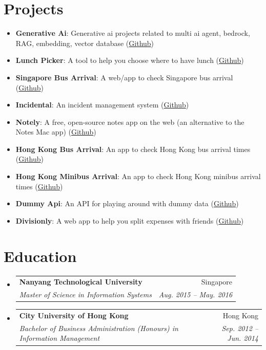 \documentclass[letterpaper,11pt]{article}
\makeatletter
\newcommand{\resumeItem}[2]{
  \item\small{
    \textbf{#1}{: #2 \vspace{-2pt}}
  }
}
\newcommand{\resumeSubheading}[4]{
  \vspace{-1pt}\item
    \begin{tabular*}{0.97\textwidth}[t]{l@{\extracolsep{\fill}}r}
      \textbf{#1} & #2 \\
      \textit{\small#3} & \textit{\small #4} \\
    \end{tabular*}\vspace{-5pt}
}
\newcommand{\resumeSubItem}[2]{\resumeItem{#1}{#2}\vspace{-4pt}}
\newcommand{\resumeSubHeadingListStart}{\begin{itemize}[leftmargin=*]}
\newcommand{\resumeSubHeadingListEnd}{\end{itemize}}
\makeatother
\begin{document}
\section{Projects}
  \resumeSubHeadingListStart
    \resumeSubItem{Generative Ai}
      {Generative ai projects related to multi ai agent, bedrock, RAG, embedding, vector database (\href{https://github.com/yeukfei02?tab=repositories&q=generative-ai&type=source&language=&sort=stargazers}{Github})}
    \resumeSubItem{Lunch Picker}
      {A tool to help you choose where to have lunch (\href{https://github.com/yeukfei02?tab=repositories&q=lunch&type=source&language=&sort=stargazers}{Github})}
    \resumeSubItem{Singapore Bus Arrival}
      {A web/app to check Singapore bus arrival (\href{https://github.com/yeukfei02?tab=repositories&q=singapore-bus&type=source&language=&sort=stargazers}{Github})}
    \resumeSubItem{Incidental}
      {An incident management system (\href{https://github.com/yeukfei02?tab=repositories&q=incident&type=source&language=&sort=stargazers}{Github})}
    \resumeSubItem{Notely}
      {A free, open-source notes app on the web (an alternative to the Notes Mac app) (\href{https://github.com/yeukfei02?tab=repositories&q=notely&type=source&language=&sort=stargazers}{Github})}
    \resumeSubItem{Hong Kong Bus Arrival}
      {An app to check Hong Kong bus arrival times (\href{https://github.com/yeukfei02?tab=repositories&q=hong+kong+bus&type=source&language=&sort=stargazers}{Github})}
    \resumeSubItem{Hong Kong Minibus Arrival}
      {An app to check Hong Kong minibus arrival times (\href{https://github.com/yeukfei02?tab=repositories&q=hong+kong+minibus&type=source&language=&sort=stargazers}{Github})}
    \resumeSubItem{Dummy Api}
      {An API for playing around with dummy data (\href{https://github.com/yeukfei02?tab=repositories&q=dummy&type=source&language=&sort=stargazers}{Github})}
    \resumeSubItem{Divisionly}
      {A web app to help you split expenses with friends (\href{https://github.com/yeukfei02?tab=repositories&q=division&type=source&language=&sort=stargazers}{Github})}
  \resumeSubHeadingListEnd


\section{Education}
  \resumeSubHeadingListStart
    \resumeSubheading
      {Nanyang Technological University}{Singapore}
      {Master of Science in Information Systems}{Aug. 2015 -- May. 2016}
    \resumeSubheading
      {City University of Hong Kong}{Hong Kong}
      {Bachelor of Business Administration (Honours) in Information Management}{Sep. 2012 -- Jun. 2014}
  \resumeSubHeadingListEnd


\end{document}
